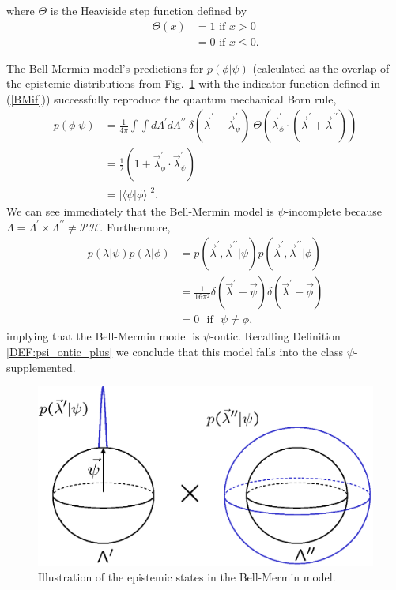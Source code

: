 \documentclass[aps,nofootinbib,12pt]{revtex4}
\begin{document}
where $\Theta$ is the Heaviside step function defined by
\begin{align*}
\Theta(x)  & =1\text{ if }x>0\\
& =0\text{ if }x\le 0.
\end{align*}


The Bell-Mermin model's predictions for $p(\phi|\psi)$ (calculated
as the overlap of the epistemic distributions from
Fig.~\ref{FIG:bmbs1and2} with the indicator function defined in
(\ref{BMif})) successfully reproduce the quantum mechanical Born
rule,
\begin{align}
p(\phi|\psi)  &
=\frac{1}{4\pi}\int\!\!\!\int{d}\Lambda^{\prime}{d}\Lambda
^{\prime\prime}\:\delta(\vec{\lambda}^{\prime}-\vec{\lambda}^{\prime}_{\psi
})\:\Theta(\vec{\lambda}^{\prime}_{\phi}\cdot(\vec{\lambda}^{\prime}%
+\vec{\lambda}^{\prime\prime}))\nonumber\\
&  =\frac{1}{2}\left(  1+\vec{\lambda}^{\prime}_{\phi}\cdot\vec{\lambda
}^{\prime}_{\psi}\right) \nonumber\\
&  =\left|  \langle\psi|\phi\rangle\right|  ^{2}.
\end{align}
We can see immediately that the Bell-Mermin model is
$\psi$-incomplete because
$\Lambda=\Lambda^{\prime}\times\Lambda^{\prime\prime}\neq\mathcal{PH}$.
Furthermore,
\begin{align}
p(\lambda|\psi)p(\lambda|\phi) &  =p(\vec{\lambda}^{\prime},\vec{\lambda
}^{\prime\prime}|\psi)p(\vec{\lambda}^{\prime},\vec{\lambda}^{\prime\prime
}|\phi)\nonumber\\
&  =\frac{1}{16\pi^{2}}\delta(\vec{\lambda}^{\prime}-\vec{\psi})\delta
(\vec{\lambda}^{\prime}-\vec{\phi})\nonumber\\
&  =0\:\:\:\text{if}\:\:\:\psi\neq\phi,
\end{align}
implying that the Bell-Mermin model is $\psi$-ontic. Recalling Definition
\ref{DEF:psi_ontic_plus} we conclude that this model falls into the class
$\psi$-supplemented.

\begin{figure}[t]
\includegraphics[scale=0.55]{bmbs1and2}\caption{Illustration of the epistemic
states in the Bell-Mermin model.} \label{FIG:bmbs1and2}
\end{figure}
\end{document}
